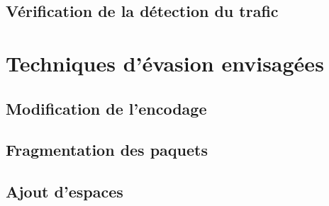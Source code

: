 \documentclass[oneside,10pt]{article}
\begin{document}
\subsection{V\'erification de la d\'etection du trafic}

\section{Techniques d'\'evasion envisag\'ees}
\subsection{Modification de l'encodage}
\subsection{Fragmentation des paquets}
\subsection{Ajout d'espaces}
\end{document}
